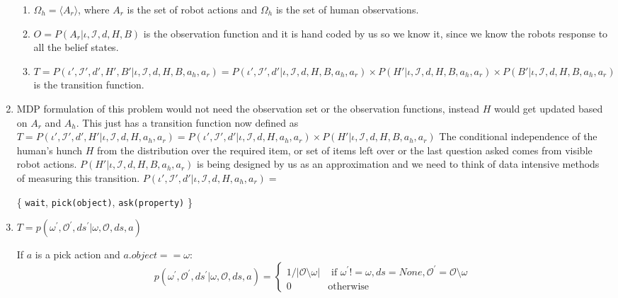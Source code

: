\documentclass{article}
\begin{document}
\begin{enumerate}
\begin{enumerate}
	
	\item $\Omega_h  = \langle A_r \rangle$, where $A_r$ is the set of robot actions and $\Omega_h$ is the set of human observations.
	
	\item $O = P(A_r | \iota, \mathcal{I}, d, H, B)$ is the observation function and it is hand coded by us so we know it, since we know the robots response to all the belief states.
	
	\item $T = P(\iota', \mathcal{I}',d',H',B' |\iota, \mathcal{I},d,H,B, a_h,a_r) = P(\iota', \mathcal{I}',d'|\iota, \mathcal{I},d,H,B, a_h,a_r) \times P(H' |\iota, \mathcal{I},d,H,B, a_h,a_r) \times P(B' |\iota, \mathcal{I},d,H,B, a_h,a_r)$  is the transition function.
	
	\end{enumerate}
	
	\item MDP formulation of this problem would not need the observation set or the observation functions, instead $H$ would get updated based on $A_r$ and $A_h$. This just has a transition function now defined as\\
	$T = P(\iota', \mathcal{I}',d',H'|\iota, \mathcal{I},d,H, a_h,a_r) = P(\iota', \mathcal{I}',d'|\iota, \mathcal{I},d,H, a_h,a_r) \times P(H' |\iota, \mathcal{I},d,H,B, a_h,a_r)$
	The conditional independence of the human's hunch $H$ from the distribution over the required item, or set of items left over or the last question asked comes from visible robot actions.
	$P(H' |\iota, \mathcal{I},d,H,B, a_h,a_r)$ is being designed by us as an approximation and we need to think of data intensive methods of measuring this transition.
	$P(\iota', \mathcal{I}',d'|\iota, \mathcal{I},d,H, a_h,a_r) =  $
	
	
	
	
	
	\{ \texttt{wait}, \texttt{pick(object)}, \texttt{ask(property)} \}
	\item $T = p(\omega^\prime, \mathcal{O}^\prime, ds^\prime| \omega, \mathcal{O}, ds, a)$

		If $a$ is a pick action and $a.object == \omega$:
		\begin{equation*}
			p(\omega^\prime, \mathcal{O}^\prime, ds^\prime| \omega, \mathcal{O}, ds, a) = \begin{cases}
				1 / |\mathcal{O} \setminus \omega| & \text{ if $\omega^\prime != \omega, ds = None, \mathcal{O}^\prime = \mathcal{O}\setminus \omega$} \\
				0 & \text{otherwise}
			\end{cases}
		\end{equation*}


\end{enumerate}
\end{document}
